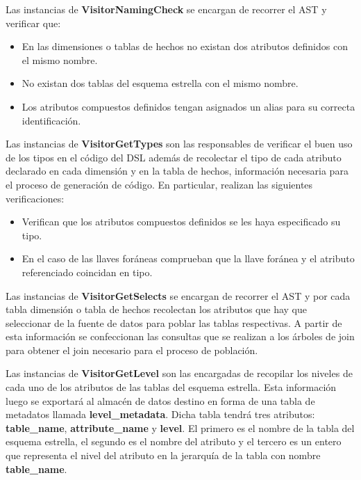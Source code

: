 Las instancias de \textbf{VisitorNamingCheck} se encargan de recorrer el AST y verificar que: 

\begin{itemize}
    \item En las dimensiones o tablas de hechos no existan dos atributos definidos con el mismo nombre.
    \item No existan dos tablas del esquema estrella con el mismo nombre.
    \item Los atributos compuestos definidos tengan asignados un alias para su correcta identificación.
\end{itemize}

Las instancias de \textbf{VisitorGetTypes} son las responsables de verificar el buen uso de los tipos en el 
código del DSL además de recolectar el tipo de cada atributo declarado en cada dimensión y 
en la tabla de hechos, 
información necesaria para el proceso de generación de código. En particular, realizan 
las siguientes verificaciones: 

\begin{itemize}
    \item Verifican que los atributos compuestos definidos se les haya especificado su tipo.
    \item En el caso de las llaves for\'aneas comprueban que la llave for\'anea y el atributo referenciado 
        coincidan en tipo.
\end{itemize}

Las instancias de \textbf{VisitorGetSelects} se encargan de recorrer el AST y por cada tabla dimensión o tabla 
de hechos recolectan los atributos que hay que seleccionar de la fuente de datos 
para poblar las tablas respectivas. A partir de esta información se confeccionan las consultas 
que se realizan a los \'arboles de join para obtener el join necesario para el proceso de población.

Las instancias de \textbf{VisitorGetLevel} son las encargadas de recopilar los niveles de cada uno de los 
atributos de las tablas del esquema estrella. Esta información luego se exportar\'a al almacén de datos 
destino en forma de una tabla de metadatos llamada \textbf{level\_metadata}. Dicha tabla tendrá tres atributos: 
\textbf{table\_name}, \textbf{attribute\_name} y \textbf{level}. El primero es el nombre de la tabla del esquema 
estrella, el segundo es el nombre del atributo y el tercero es un entero que representa el nivel del atributo 
en la jerarquía de la tabla con nombre \textbf{table\_name}.

